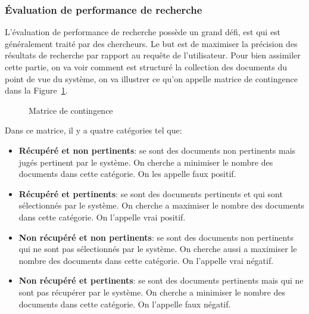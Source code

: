 \subsubsection{Évaluation de performance de recherche}
L'évaluation de performance de recherche possède un grand défi, est qui est généralement traité par des chercheurs. Le but est de maximiser la précision des résultats de recherche par rapport au requête de l'utilisateur. Pour bien assimiler cette partie, on va voir comment est structuré la collection des documents du point de vue du système, on va illustrer ce qu'on appelle matrice de contingence dans la Figure~\ref{fig:matrice-contingence}.

\begin{figure}[htbp]
	\begin{center}
	\end{center}
	\caption{Matrice de contingence \citep{vsm-for-arabic-language}}
	\label{fig:matrice-contingence}
\end{figure}

Dans ce matrice, il y a quatre catégories tel que:
\begin{itemize}
	\item \textbf{Récupéré et non pertinents}: se sont des documents non pertinents mais jugés pertinent par le système. On cherche a minimiser le nombre des documents dans cette catégorie. On les appelle faux positif.
	\item \textbf{Récupéré et pertinents}: se sont des documents pertinents et qui sont sélectionnés par le système. On cherche a maximiser le nombre des documents dans cette catégorie. On l'appelle vrai positif.
	\item \textbf{Non récupéré et non pertinents}: se sont des documents non pertinents qui ne sont pas sélectionnés par le système. On cherche aussi a maximiser le nombre des documents dans cette catégorie. On l'appelle vrai négatif.
	\item \textbf{Non récupéré et pertinents}: se sont des documents pertinents mais qui ne sont pas récupérer par le système. On cherche a minimiser le nombre des documents dans cette catégorie. On l'appelle faux négatif.
\end{itemize}

